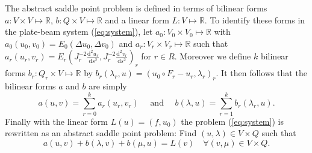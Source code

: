 \documentclass{marine_2015}
\newcommand{\inner}[2]{\ensuremath{\left(#1, #2\right)}}
\newcommand{\rinner}[2]{\ensuremath{\left(#1, #2\right)_r}}
\newcommand{\ainner}[2]{\ensuremath{a\left(#1, #2\right)}}
\newcommand{\arinner}[2]{\ensuremath{a_r\left(#1, #2\right)}}
\newcommand{\binner}[2]{\ensuremath{b\left(#1, #2\right)}}
\newcommand{\brinner}[2]{\ensuremath{b_r\left(#1, #2\right)}}
\newcommand{\Linner}[1]{\ensuremath{L\left(#1\right)}}
\newcommand{\tderiv}[2]{\ensuremath{\tfrac{\mathrm{d}#1}{\mathrm{d}#2}}}
\begin{document}
The abstract saddle point problem is defined in terms of bilinear forms $a:V\times V\mapsto \mathbb{R}$,
$b:Q\times V\mapsto \mathbb{R}$ and a linear form $L:V\mapsto\mathbb{R}$. To identify these 
forms in the plate-beam system (\ref{eq:system}), let $a_0:V_0\times V_0\mapsto
\mathbb{R}$ with $a_0\left(u_0, v_0\right)=E_0\inner{\Delta u_0}{\Delta v_0}$ and
$a_r:V_r\times V_r\mapsto \mathbb{R}$ such that $\arinner{u_r}{v_r}=E_r\rinner{J_r^{-2}\tderiv{^2 u_r}{s^2}}{J_r^{-2}\tderiv{^2
v_r}{s^2}}$ for $r\in R$. Moreover we define $k$ bilinear forms
$b_r:Q_r\times V\mapsto\mathbb{R}$ by
$\brinner{\lambda_r}{u}=\rinner{u_0\circ F_r-u_r}{\lambda_r}$. It then follows 
that the bilinear forms $a$ and $b$ are simply
\[
  \ainner{u}{v} = \displaystyle\sum_{r=0}^{k}\arinner{u_r}{v_r}\quad\text{ and
  }\quad\binner{\lambda}{u} = \displaystyle\sum_{r=1}^{k}\brinner{\lambda_r}{u}.
\]
Finally with the linear form $\Linner{u}=\inner{f}{u_0}$ the problem
(\ref{eq:system}) is rewritten as an abstract saddle point problem: Find
$\left(u, \lambda\right)\in V\times Q$ such that
\begin{equation}
  \label{eq:abstract_saddle}
  \ainner{u}{v} + \binner{\lambda}{v} + \binner{\mu}{u} = \Linner{v}\quad\forall
  \left(v, \mu\right)\in V\times Q.
\end{equation}
\end{document}
